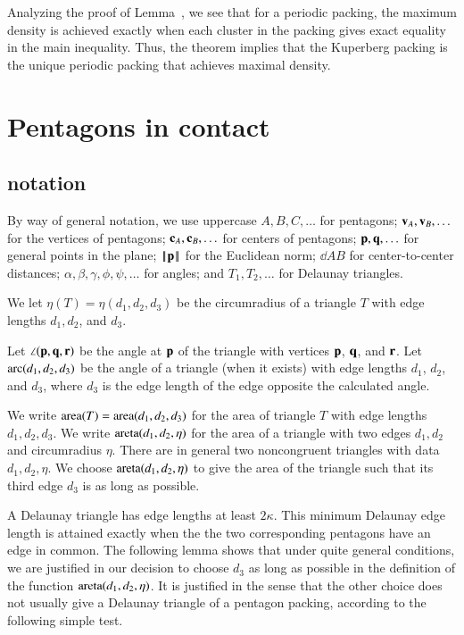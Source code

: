 Analyzing the proof of Lemma~, we see that for a
periodic packing, the maximum density is achieved exactly when each
 cluster in the packing gives exact equality in the main inequality.
Thus, the theorem implies that the Kuperberg packing is the
unique periodic packing that achieves maximal density.




\section{Pentagons in contact}


\subsection{notation}

By way of general notation, we use uppercase $A,B,C,\ldots$ for
pentagons; ${\mathbf v}_A,{\mathbf v}_B,\ldots$ for the vertices of pentagons;
${\mathbf c}_A,{\mathbf c}_B,\ldots$ for centers of pentagons; ${\mathbf p},{\mathbf q},\ldots$ for
general points in the plane; ${\hbox{\ensuremath{\hspace{0.1em}|\hspace{-0.1em}|\hspace{0.1em}}}{\mathbf p}\hbox{\ensuremath{\hspace{0.1em}|\hspace{-0.1em}|\hspace{0.1em}}}}$ for the Euclidean norm;
$\dd{A}{B}$ for center-to-center distances;
$\alpha,\beta,\gamma,\phi,\psi,\ldots$ for angles; and $T_1,T_2,\ldots$
for Delaunay triangles.

We let $\eta(T) = \eta(d_1,d_2,d_3)$ be the circumradius of a triangle
$T$ with edge lengths $d_1,d_2$, and $d_3$.

Let $\angle({\mathbf p},{\mathbf q},{\mathbf r})$ be the angle at ${\mathbf p}$ of the triangle with
vertices ${\mathbf p}$, ${\mathbf q}$, and ${\mathbf r}$.  Let $\operatorname{arc}(d_1,d_2,d_3)$ be the angle
of a triangle (when it exists) with edge lengths $d_1$, $d_2$, and
$d_3$, where $d_3$ is the edge length of the edge opposite the
calculated angle.




We write ${\operatorname{area}}(T)= {\operatorname{area}}(d_1,d_2,d_3)$ for the area of triangle $T$
with edge lengths $d_1,d_2,d_3$.  We write
${\operatorname{areta}}(d_1,d_2,\eta)$ for the area of a triangle with two edges
$d_1,d_2$ and circumradius $\eta$.  There are in general two
noncongruent triangles with data $d_1,d_2,\eta$.  We choose
${\operatorname{areta}}(d_1,d_2,\eta)$ to give the area of the triangle such that its
third edge $d_3$ is as long as possible.

A Delaunay triangle has edge lengths at least $2\kappa$.  This minimum
Delaunay edge length is attained exactly when the the two
corresponding pentagons have an edge in common.  The following lemma
shows that under quite general conditions, we are justified in our
decision to choose $d_3$ as long as possible in the definition of the
function ${\operatorname{areta}}(d_1,d_2,\eta)$.  It is justified in the sense that
the other choice does not usually give a Delaunay triangle of a pentagon
packing, according to the following simple test.

